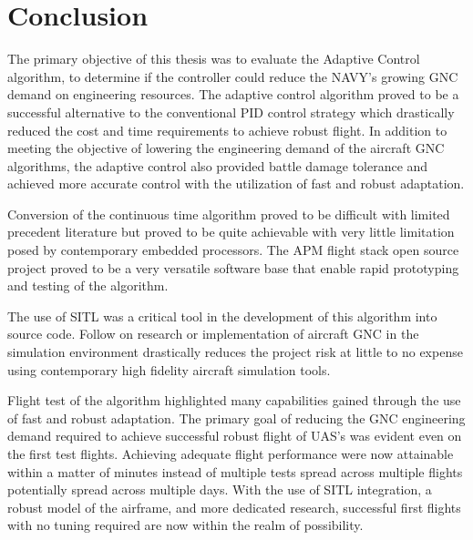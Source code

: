 \chapter{Conclusion}\label{ch:conclusion}

The primary objective of this thesis was to evaluate the \Lone Adaptive Control algorithm, to determine if the controller could reduce the NAVY's growing \ac{GNC} demand on engineering resources.  The \Lone adaptive control algorithm proved to be a successful alternative to the conventional \ac{PID} control strategy which drastically reduced the cost and time requirements to achieve robust flight.  In addition to meeting the objective of lowering the engineering demand of the aircraft \ac{GNC} algorithms, the \Lone adaptive control also provided battle damage tolerance and achieved more accurate control with the utilization of fast and robust adaptation.

Conversion of the continuous time \Lone algorithm proved to be difficult with limited precedent literature but proved to be quite achievable with very little limitation posed by contemporary embedded processors.  The \ac{APM} flight stack open source project proved to be a very versatile software base that enable rapid prototyping and testing of the \Lone algorithm.  

The use of \ac{SITL} was a critical tool in the development of this algorithm into source code.  Follow on research or implementation of aircraft \ac{GNC} in the simulation environment drastically reduces the project risk at little to no expense using contemporary high fidelity aircraft simulation tools.

Flight test of the \Lone algorithm highlighted many capabilities gained through the use of fast and robust adaptation.  The primary goal of reducing the \ac{GNC} engineering demand required to achieve successful robust flight of \ac{UAS}'s was evident even on the first test flights.  Achieving adequate flight performance were now attainable within a matter of minutes instead of multiple tests spread across multiple flights potentially spread across multiple days.  With the use of \ac{SITL} integration, a robust model of the airframe, and more dedicated research, successful first flights with no tuning required are now within the realm of possibility.




